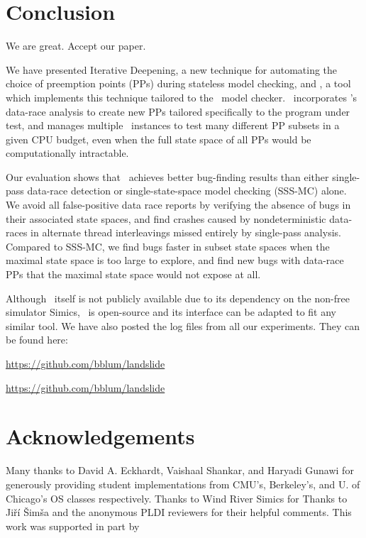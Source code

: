 \documentclass[pldi]{sigplanconf-pldi15}
\begin{document}






\section{Conclusion}

We are
great. Accept our paper.

We have presented Iterative Deepening, a new technique for automating the choice of preemption points (PPs) during stateless model checking, and \quicksand, a tool which implements this technique tailored to the \landslide~model checker.
\quicksand~incorporates \landslide's data-race analysis to create new PPs tailored specifically to the program under test,
and manages multiple \landslide~instances to test many different PP subsets in a given CPU budget, even when the full state space of all PPs would be computationally intractable.

Our evaluation shows that \quicksand~achieves better bug-finding results than either single-pass data-race detection or single-state-space model checking (SSS-MC) alone.
We avoid all false-positive data race reports by verifying the absence of bugs in their associated state spaces, and find crashes caused by nondeterministic data-races in alternate thread interleavings missed entirely by single-pass analysis.
Compared to SSS-MC, we find bugs faster in subset state spaces when the maximal state space is too large to explore, and find new bugs with data-race PPs that the maximal state space would not expose at all.

Although \landslide~itself is not publicly available due to its dependency on the non-free simulator {\sc Simics}, \quicksand~is open-source and its interface can be adapted to fit any similar tool.
We have also posted the log files from all our experiments.
They can be found here:

\url{https://github.com/bblum/landslide} %

\url{https://github.com/bblum/landslide} %

\section{Acknowledgements}

Many thanks to David A. Eckhardt, Vaishaal Shankar, and Haryadi Gunawi for generously providing student implementations from CMU's, Berkeley's, and U. of Chicago's OS classes respectively.
Thanks to Wind River Simics for %
Thanks to Ji\v{r}\'{i} \v{S}im\v{s}a and the anonymous PLDI reviewers for their helpful comments.
This work was supported in part by %



{}
\end{document}

